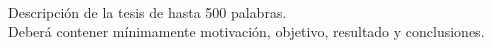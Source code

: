 \ \\
\ \\
\label{pagresum}
\\
\ \\
\ \\

\ \\

\ \\
\ \\
Descripci\'on de la tesis de hasta 500 palabras.\\

 Deberá contener mínimamente motivación,  objetivo, resultado y conclusiones. 

\vfill
\pagebreak
